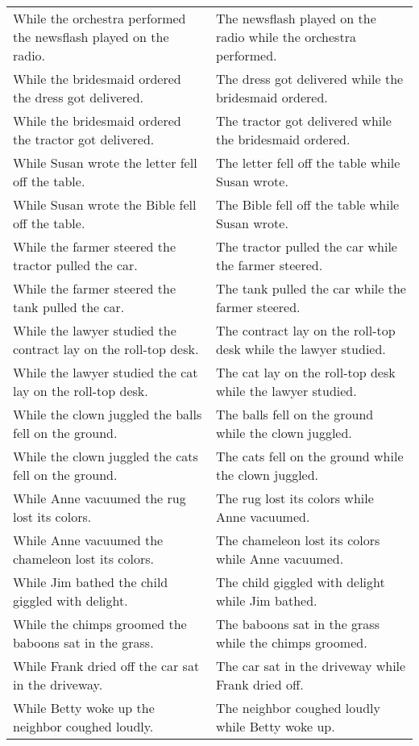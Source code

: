 \begin{center}
\begin{xtabular*}{\textwidth}{p{0.45\textwidth}|p{0.45\textwidth}}
        While the orchestra performed the newsflash played on the radio. & The newsflash played on the radio while the orchestra performed. \\
        While the bridesmaid ordered the dress got delivered. & The dress got delivered while the bridesmaid ordered. \\
        While the bridesmaid ordered the tractor got delivered. & The tractor got delivered while the bridesmaid ordered. \\
        While Susan wrote the letter fell off the table. & The letter fell off the table while Susan wrote. \\
        While Susan wrote the Bible fell off the table. & The Bible fell off the table while Susan wrote. \\
        While the farmer steered the tractor pulled the car. & The tractor pulled the car while the farmer steered. \\
        While the farmer steered the tank pulled the car. & The tank pulled the car while the farmer steered. \\
        While the lawyer studied the contract lay on the roll-top desk. & The contract lay on the roll-top desk while the lawyer studied. \\
        While the lawyer studied the cat lay on the roll-top desk. & The cat lay on the roll-top desk while the lawyer studied. \\
        While the clown juggled the balls fell on the ground. & The balls fell on the ground while the clown juggled. \\
        While the clown juggled the cats fell on the ground. & The cats fell on the ground while the clown juggled. \\
        While Anne vacuumed the rug lost its colors. & The rug lost its colors while Anne vacuumed. \\
        While Anne vacuumed the chameleon lost its colors. & The chameleon lost its colors while Anne vacuumed. \\
        While Jim bathed the child giggled with delight. & The child giggled with delight while Jim bathed. \\
        While the chimps groomed the baboons sat in the grass. & The baboons sat in the grass while the chimps groomed. \\
        While Frank dried off the car sat in the driveway. & The car sat in the driveway while Frank dried off. \\
        While Betty woke up the neighbor coughed loudly. & The neighbor coughed loudly while Betty woke up. \\

\end{xtabular*}
\end{center}
